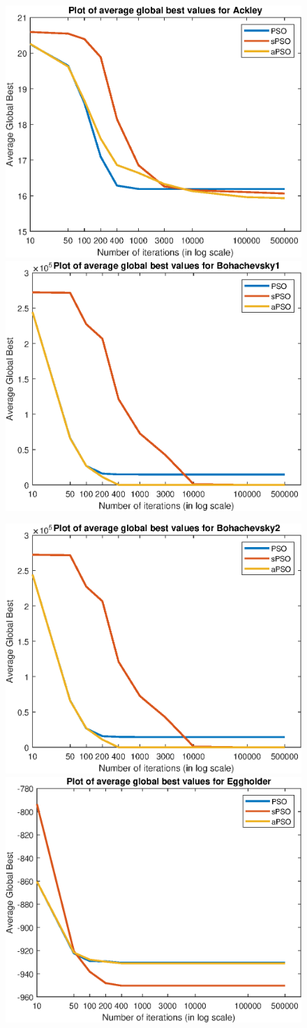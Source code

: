\documentclass[12pt]{article}
\theoremstyle{definition}
\begin{document}
\begin{figure}[H]
    \centering
    \includegraphics[height=0.35\textwidth,width=.45\textwidth]{gbests/Ackley_500k.eps} \quad
    \includegraphics[height=0.35\textwidth,width=.45\textwidth]{gbests/Bohachevsky1_500k.eps}
    \medskip
    
    \includegraphics[height=0.35\textwidth,width=.45\textwidth]{gbests/Bohachevsky2_500k.eps} \quad
    \includegraphics[height=0.35\textwidth,width=.45\textwidth]{gbests/Eggholder_500k.eps}
    \medskip
    

\end{figure}
\end{document}
